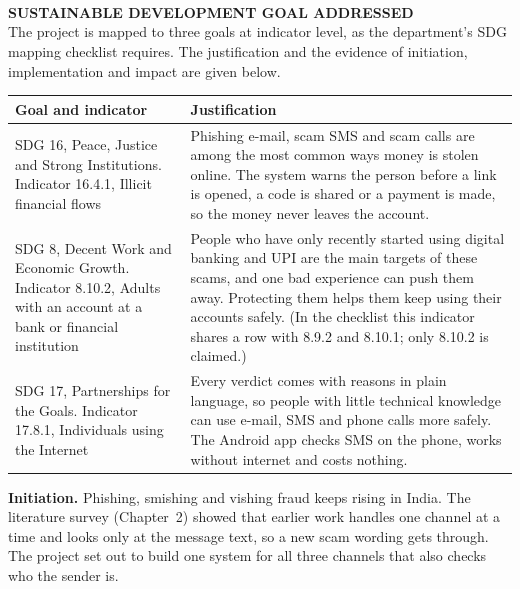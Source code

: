 \chapter*{}                  %
\\[0.3cm]
{\Large\bfseries SUSTAINABLE DEVELOPMENT GOAL ADDRESSED}\\[0.3cm]

The project is mapped to three goals at indicator level, as the department's SDG mapping checklist requires. The justification and the evidence of initiation, implementation and impact are given below.

{\small{}
\begin{longtable}{|p{3.6cm}|p{10.6cm}|}
\hline \textbf{Goal and indicator} & \textbf{Justification} \\ \hline
\endhead
SDG 16, Peace, Justice and Strong Institutions. Indicator 16.4.1, Illicit financial flows & Phishing e-mail, scam SMS and scam calls are among the most common ways money is stolen online. The system warns the person before a link is opened, a code is shared or a payment is made, so the money never leaves the account. \\ \hline
SDG 8, Decent Work and Economic Growth. Indicator 8.10.2, Adults with an account at a bank or financial institution & People who have only recently started using digital banking and UPI are the main targets of these scams, and one bad experience can push them away. Protecting them helps them keep using their accounts safely. (In the checklist this indicator shares a row with 8.9.2 and 8.10.1; only 8.10.2 is claimed.) \\ \hline
SDG 17, Partnerships for the Goals. Indicator 17.8.1, Individuals using the Internet & Every verdict comes with reasons in plain language, so people with little technical knowledge can use e-mail, SMS and phone calls more safely. The Android app checks SMS on the phone, works without internet and costs nothing. \\ \hline
\end{longtable}
}

\vspace{0.3cm}
\noindent\textbf{Initiation.} Phishing, smishing and vishing fraud keeps rising in India. The literature survey (Chapter~2) showed that earlier work handles one channel at a time and looks only at the message text, so a new scam wording gets through. The project set out to build one system for all three channels that also checks who the sender is.

